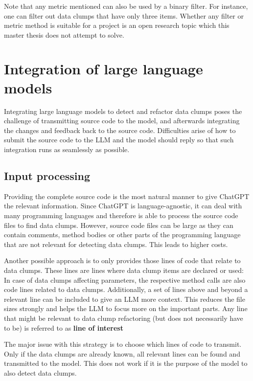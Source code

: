 Note that any metric mentioned can also be used by a binary filter. For instance, one can filter out data clumps that have only three items.
Whether any filter or metric method is suitable for a project is an open research topic which this master thesis does not attempt to solve. 






\label{sec:implementation_tools}



\section{Integration of large language models}
Integrating large language models to detect and refactor data clumps poses the challenge of transmitting source code to the model, and afterwards integrating the changes and  feedback back to the source code. Difficulties arise of how to submit the source code to the \ac{LLM} and  the model should reply so that such integration runs as seamlessly as possible. 

\subsection{Input processing}
Providing the complete source code is the most natural manner to give ChatGPT the relevant information. Since ChatGPT is language-agnostic, it can deal with many programming languages and therefore is able to process the source code files to find data clumps. However, source code files can be large as they can contain comments, method bodies or other parts of the programming language that are not relevant for detecting data clumps. This leads to higher costs.

Another possible approach is to only provides those lines of code that relate to data clumps. These lines are lines where data clump items are declared or used: In case of data clumps affecting parameters, the respective method calls are also code lines related to data clumps. Additionally, a set of lines above and beyond a relevant line can be included to give an \ac{LLM} more context. This reduces the file sizes strongly and helps the \ac{LLM} to focus more on the important parts. Any line that might be relevant to data clump refactoring (but does not necessarily have to be) is referred to as \textbf{line of interest}

The major issue with this strategy is to choose which lines of code to transmit. Only if the data clumps are already known, all relevant lines can be found and transmitted to the model. This does not work if it is the purpose of the model to also detect data clumps. 

